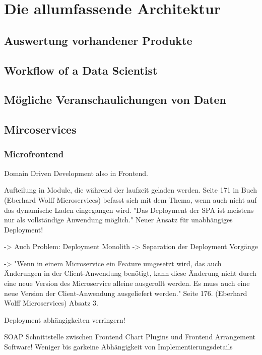 \chapter{Die allumfassende Architektur}
\label{chap:die-allumfassende-architektur}

\section{Auswertung vorhandener Produkte}

\section{Workflow of a Data Scientist}

\section{Mögliche Veranschaulichungen von Daten}

\section{Mircoservices}

\subsection{Microfrontend}
Domain Driven Development also in Frontend.

Aufteilung in Module, die während der laufzeit geladen werden.
Seite 171 in Buch (Eberhard Wolff Microservices) befasst sich mit dem
Thema, wenn auch nicht auf das dynamische Laden eingegangen wird.
"Das Deployment der SPA ist meistens nur als vollständige Anwendung möglich."
Neuer Ansatz für unabhängiges Deployment!

-> Auch Problem: Deployment Monolith -> Separation der Deployment Vorgänge

-> "Wenn in einem Microservice ein Feature umgesetzt wird, das auch Änderungen
in der Client-Anwendung benötigt, kann diese Änderung nicht durch eine neue
Version des Microservice alleine ausgerollt werden. Es muss auch eine neue Version
der Client-Anwendung ausgeliefert werden." Seite 176.  (Eberhard Wolff Microservices)
Absatz 3.

Deployment abhängigkeiten verringern!

SOAP Schnittstelle zwischen Frontend Chart Plugins und Frontend Arrangement Software!
Weniger bis garkeine Abhängigkeit von Implementierungsdetails

